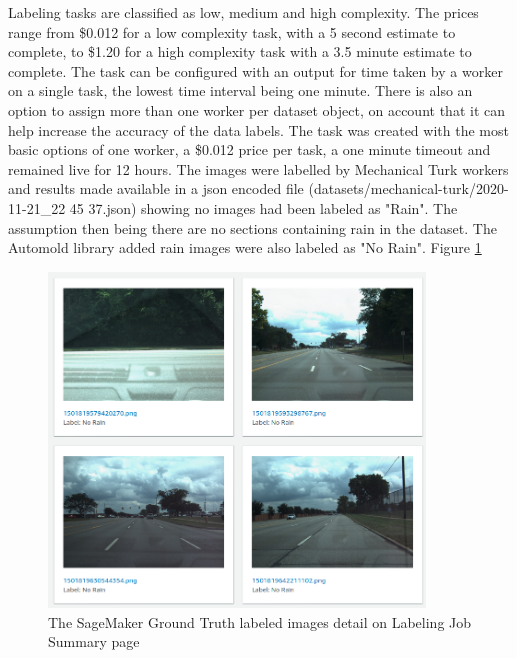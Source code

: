 Labeling tasks are classified as low, medium and high complexity. The prices range from \$0.012 for a low complexity task, with a 5 second estimate to complete, to \$1.20 for a high complexity task with a 3.5 minute estimate to complete.
The task can be configured with an output for time taken by a worker on a single task, the lowest time interval being one minute.
There is also an option to assign more than one worker per dataset object, on account that it can help increase the accuracy of the data labels.
The task was created with the most basic options of one worker, a \$0.012 price per task, a one minute timeout and remained live for 12 hours. 
The images were labelled by Mechanical Turk workers and results made available in a json encoded file (datasets/mechanical-turk/2020-11-21\_22 45 37.json) showing no images had been labeled as "Rain". The assumption then being there are no sections containing rain in the dataset. The Automold library added rain images were also labeled as "No Rain". Figure \ref{fig:MechTurkLabeledImages}
\begin{figure}[h!]
\centering
\includegraphics[width=10cm]{Figures/MechTurkLabeledImages.png}
\caption{The SageMaker Ground Truth labeled images detail on Labeling Job Summary page}
\label{fig:MechTurkLabeledImages}
\end{figure}

